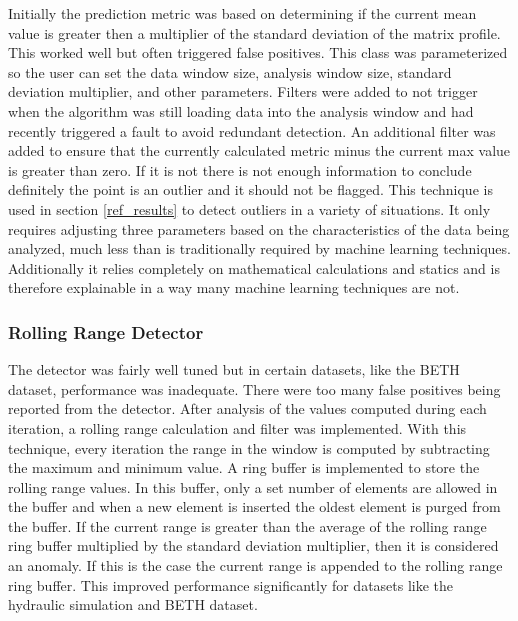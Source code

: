 Initially the prediction metric was based on determining if the current mean value is greater then a multiplier of the standard deviation of the matrix profile. This worked well but often triggered false positives. This class was parameterized so the user can set the data window size, analysis window size, standard deviation multiplier, and other parameters. Filters were added to not trigger when the algorithm was still loading data into the analysis window and had recently triggered a fault to avoid redundant detection. An additional filter was added to ensure that the currently calculated metric minus the current max value is greater than zero. If it is not there is not enough information to conclude definitely the point is an outlier and it should not be flagged. This technique is used in section \ref{ref_results} to detect outliers in a variety of situations. It only requires adjusting three parameters based on the characteristics of the data being analyzed, much less than is traditionally required by machine learning techniques. Additionally it relies completely on mathematical calculations and statics and is therefore explainable in a way many machine learning techniques are not. 

\subsubsection{Rolling Range Detector}

The detector was fairly well tuned but in certain datasets, like the BETH dataset, performance was inadequate. There were too many false positives being reported from the detector. After analysis of the values computed during each iteration, %
a rolling range calculation and filter was implemented. With this technique, every iteration the range in the window is computed by subtracting the maximum and minimum value. A ring buffer is implemented to store the rolling range values. In this buffer, only a set number of elements are allowed in the buffer and when a new element is inserted the oldest element is purged from the buffer. If the current range is greater than the average of the rolling range ring buffer multiplied by the standard deviation multiplier, then it is considered an anomaly. If this is the case the current range is appended to the rolling range ring buffer. This improved performance significantly for datasets like the hydraulic simulation and BETH dataset.